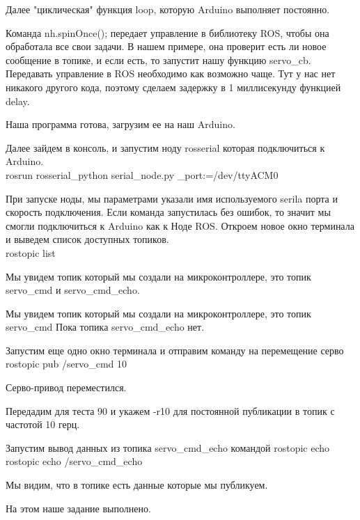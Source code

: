 Далее "циклическая" функция loop, которую Arduino выполняет постоянно.

Команда nh.spinOnce(); передает управление в библиотеку ROS, чтобы она обработала все свои задачи. В нашем примере, она проверит есть ли новое сообщение в топике, и если есть, то запустит нашу функцию servo\_cb. Передавать управление в ROS необходимо как возможно чаще. Тут у нас нет никакого другого кода, поэтому сделаем задержку в 1 миллисекунду функцией delay.

Наша программа готова, загрузим ее на наш Arduino.

Далее зайдем в консоль, и запустим ноду rosserial которая подключиться к Arduino.\\
rosrun rosserial\_python serial\_node.py \_port:=/dev/ttyACM0

При запуске ноды, мы параметрами указали имя используемого serila порта и скорость подключения.
Если команда запустилась без ошибок, то значит мы смогли подключиться к Arduino как к Ноде ROS.
Откроем новое окно терминала и выведем список доступных топиков.\\
rostopic list

Мы увидем топик который мы создали на микроконтроллере, это топик servo\_cmd и servo\_cmd\_echo.

Мы увидем топик который мы создали на микроконтроллере, это топик servo\_cmd Пока топика servo\_cmd\_echo нет.

Запустим еще одно окно терминала и отправим команду на перемещение серво\\
rostopic pub /servo\_cmd 10

Серво-привод переместился.

Передадим для теста 90 и укажем -r10 для постоянной публикации в топик с частотой 10 герц.

Запустим вывод данных из топика servo\_cmd\_echo командой rostopic echo\\
rostopic echo /servo\_cmd\_echo

Мы видим, что в топике есть данные которые мы публикуем.

На этом наше задание выполнено.

\codeExample

\inputminted[fontsize=\footnotesize, linenos]{cpp}{2nd_tour/aero_sys/task_02/source.cpp}